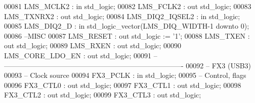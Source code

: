 \begin{DoxyCode}
00081       \textcolor{vhdlchar}{LMS_MCLK2}         \textcolor{vhdlchar}{:} \textcolor{keywordflow}{in}     \textcolor{comment}{std\_logic};
00082       \textcolor{vhdlchar}{LMS_FCLK2}         \textcolor{vhdlchar}{:} \textcolor{keywordflow}{out}    \textcolor{comment}{std\_logic};
00083       \textcolor{vhdlchar}{LMS_TXNRX2}        \textcolor{vhdlchar}{:} \textcolor{keywordflow}{out}    \textcolor{comment}{std\_logic};
00084       \textcolor{vhdlchar}{LMS_DIQ2_IQSEL2}   \textcolor{vhdlchar}{:} \textcolor{keywordflow}{in}     \textcolor{comment}{std\_logic};
00085       \textcolor{vhdlchar}{LMS_DIQ2_D}        \textcolor{vhdlchar}{:} \textcolor{keywordflow}{in}     \textcolor{comment}{std\_logic\_vector}\textcolor{vhdlchar}{(}\textcolor{vhdlchar}{LMS_DIQ_WIDTH}\textcolor{vhdlchar}{-}\textcolor{vhdllogic}{}\textcolor{vhdllogic}{1} \textcolor{keywordflow}{downto} \textcolor{vhdllogic}{}\textcolor{vhdllogic}{0}\textcolor{vhdlchar}{)};
00086 \textcolor{keyword}{         --MISC}
00087       \textcolor{vhdlchar}{LMS_RESET}         \textcolor{vhdlchar}{:} \textcolor{keywordflow}{out}    \textcolor{comment}{std\_logic} \textcolor{vhdlchar}{:=} \textcolor{vhdlchar}{'}\textcolor{vhdllogic}{}\textcolor{vhdllogic}{1}\textcolor{vhdlchar}{'};
00088       \textcolor{vhdlchar}{LMS_TXEN}          \textcolor{vhdlchar}{:} \textcolor{keywordflow}{out}    \textcolor{comment}{std\_logic};
00089       \textcolor{vhdlchar}{LMS_RXEN}          \textcolor{vhdlchar}{:} \textcolor{keywordflow}{out}    \textcolor{comment}{std\_logic};
00090       \textcolor{vhdlchar}{LMS_CORE_LDO_EN}   \textcolor{vhdlchar}{:} \textcolor{keywordflow}{out}    \textcolor{comment}{std\_logic};
00091 \textcolor{keyword}{      -- ----------------------------------------------------------------------------}
00092 \textcolor{keyword}{      -- FX3 (USB3)}
00093 \textcolor{keyword}{         -- Clock source}
00094       \textcolor{vhdlchar}{FX3_PCLK}          \textcolor{vhdlchar}{:} \textcolor{keywordflow}{in}     \textcolor{comment}{std\_logic};
00095 \textcolor{keyword}{         -- Control, flags}
00096       \textcolor{vhdlchar}{FX3_CTL0}          \textcolor{vhdlchar}{:} \textcolor{keywordflow}{out}    \textcolor{comment}{std\_logic};
00097       \textcolor{vhdlchar}{FX3_CTL1}          \textcolor{vhdlchar}{:} \textcolor{keywordflow}{out}    \textcolor{comment}{std\_logic};
00098       \textcolor{vhdlchar}{FX3_CTL2}          \textcolor{vhdlchar}{:} \textcolor{keywordflow}{out}    \textcolor{comment}{std\_logic};
00099       \textcolor{vhdlchar}{FX3_CTL3}          \textcolor{vhdlchar}{:} \textcolor{keywordflow}{out}    \textcolor{comment}{std\_logic};

\end{DoxyCode}
